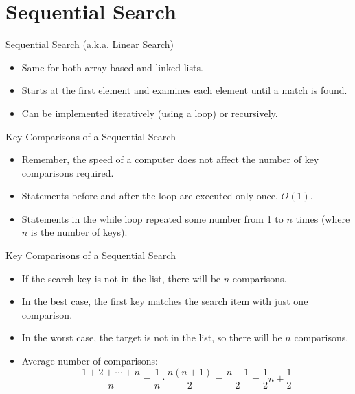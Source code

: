 \documentclass[14pt,aspectratio=1610]{beamer}
\begin{document}
\section{Sequential Search}

\begin{frame}{Sequential Search (a.k.a. Linear Search)}
\begin{itemize}
  \item
    Same for both array-based and linked lists.
  \item
    Starts at the first element and examines each element until a match is found.
  \item
    Can be implemented iteratively (using a loop) or recursively.
\end{itemize}
\end{frame}

\begin{frame}{Key Comparisons of a Sequential Search}
\begin{itemize}[<+->]
  \item
    Remember, the speed of a computer does not affect the number of key comparisons required.
  \item
    Statements before and after the loop are executed only once, $O(1)$.
  \item
    Statements in the while loop repeated some number from 1 to $n$ times (where $n$ is the number of keys).
\end{itemize}
\end{frame}

\begin{frame}{Key Comparisons of a Sequential Search}
\begin{itemize}[<+->]
  \item
    If the search key is not in the list, there will be \(n\) comparisons.
  \item
    In the best case, the first key matches the search item with just one comparison.
  \item
    In the worst case, the target is not in the list, so there will be \(n\) comparisons.
  \item
    Average number of comparisons:
    \begin{equation*}
      \frac{1 + 2 + \cdots + n}{n} = \frac{1}{n} \cdot \frac{n (n + 1)}{2} = \frac{n + 1}{2} = \frac{1}{2}n + \frac{1}{2}
    \end{equation*}
\end{itemize}
\end{frame}
\end{document}
